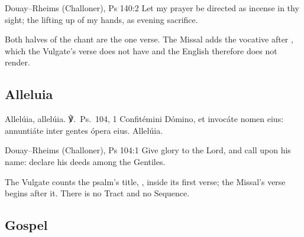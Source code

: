 \begin{englishwitness}{Douay--Rheims (Challoner), Ps 140:2}
Let my prayer be directed as incense in thy sight; the lifting up of my hands,
as evening sacrifice.
\end{englishwitness}

\noindent Both halves of the chant are the one verse. The Missal adds the
vocative  after , which the Vulgate's verse
does not have and the English therefore does not render.

\subsection{Alleluia}
\label{proper-alleluia}


\begin{latinproper}
Allelúia, allelúia. ℣.~\textnormal{Ps.\ 104, 1} Confitémini Dómino, et invocáte
nomen eius: annuntiáte inter gentes ópera eius. Allelúia.
\end{latinproper}

\begin{englishwitness}{Douay--Rheims (Challoner), Ps 104:1}
Give glory to the Lord, and call upon his name: declare his deeds among the
Gentiles.
\end{englishwitness}

\noindent The Vulgate counts the psalm's title, , inside its
first verse; the Missal's verse begins after it. There is no Tract and no
Sequence.

\subsection{Gospel}
\label{proper-gospel}



